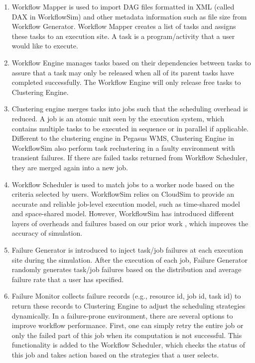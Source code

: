\begin{enumerate}

\item {Workflow Mapper} is used to import DAG files formatted in XML (called DAX in WorkflowSim) and other metadata information such as file size from Workflow Generator. Workflow Mapper creates a list of tasks and assigns these tasks to an execution site. A task is a program/activity that a user would like to execute. 

\item{Workflow Engine} manages tasks based on their dependencies between tasks to assure that a task may only be released when all of its parent tasks have completed successfully. The Workflow Engine will only release free tasks to Clustering Engine. 

\item{Clustering engine} merges tasks into jobs such that the scheduling overhead is reduced. A job is an atomic unit seen by the execution system, which contains multiple tasks to be executed in sequence or in parallel if applicable. Different to the clustering engine in Pegasus WMS, Clustering Engine in WorkflowSim also perform task reclustering in a faulty environment with transient failures. If there are failed tasks returned from Workflow Scheduler, they are merged again into a new job.  

\item{Workflow Scheduler} is used to match jobs to a worker node based on the criteria selected by users. WorkflowSim relies on CloudSim to provide an accurate and reliable job-level execution model, such as time-shared model and space-shared model. However, WorkflowSim has introduced different layers of overheads and failures based on our prior work \cite{Chen2011}, which improves the accuracy of simulation. 

\item{Failure Generator} is introduced to inject task/job failures at each execution site during the simulation. After the execution of each job, Failure Generator randomly generates task/job failures based on the distribution and average failure rate that a user has specified. 

\item{Failure Monitor} collects failure records (e.g., resource id, job id, task id) to return these records to Clustering Engine to adjust the scheduling strategies dynamically. In a failure-prone environment, there are several options to improve workflow performance. First, one can simply retry the entire job or only the failed part of this job when its computation is not successful.  This functionality is added to the Workflow Scheduler, which checks the status of this job and takes action based on the strategies that a user selects. 

\end{enumerate}


